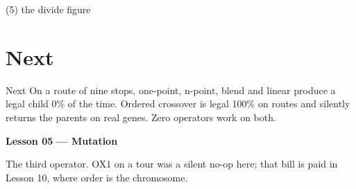 \begin{frame}[fragile]{(5) the divide figure}

\end{frame}


\section{Next}

\begin{frame}{Next}
On a route of nine stops, one-point, n-point, blend and linear produce a legal child 0\% of the time. Ordered crossover is legal 100\% on routes and silently returns the parents on real genes. Zero operators work on both.

\vspace{0.8em}
\textbf{Lesson 05 --- Mutation}

The third operator. OX1 on a tour was a silent no-op here; that bill is paid in Lesson 10, where order is the chromosome.
\end{frame}

